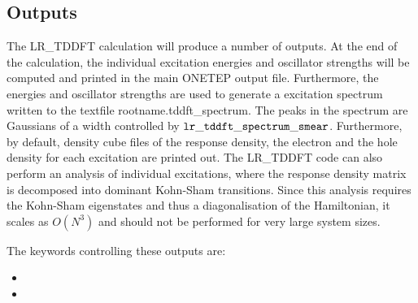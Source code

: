 \documentclass[letterpaper,10pt,english]{sphinxmanual}
\begin{document}
\subsection{Outputs}
\label{\detokenize{lr_tddft:outputs}}
The LR\_TDDFT calculation will produce a number of outputs. At the end
of the calculation, the individual excitation energies and oscillator
strengths will be computed and printed in the main ONETEP output file.
Furthermore, the energies and oscillator strengths are used to generate
a excitation spectrum written to the textfile rootname.tddft\_spectrum.
The peaks in the spectrum are Gaussians of a width controlled by
\(\tt{lr\_tddft\_spectrum\_smear}\). Furthermore, by default,
density cube files of the response density, the electron and the hole
density for each excitation are printed out. The LR\_TDDFT code can also
perform an analysis of individual excitations, where the response
density matrix is decomposed into dominant Kohn-Sham transitions. Since
this analysis requires the Kohn-Sham eigenstates and thus a
diagonalisation of the Hamiltonian, it scales as \(O(N^3)\) and
should not be performed for very large system sizes.

The keywords controlling these outputs are:
\begin{itemize}
\item {} 

\item {} 

\end{itemize}
\end{document}
